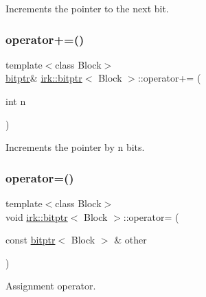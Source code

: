 Increments the pointer to the next bit. 

\mbox{\label{classirk_1_1bitptr_a9fcc393a8789c4500391ff3ff2a9fff7}} 
\subsubsection{\texorpdfstring{operator+=()}{operator+=()}}
{\footnotesize\ttfamily template$<$class Block$>$ \\
\mbox{\hyperlink{classirk_1_1bitptr}{bitptr}}\& \mbox{\hyperlink{classirk_1_1bitptr}{irk\+::bitptr}}$<$ Block $>$\+::operator+= (\begin{DoxyParamCaption}\item[{int}]{n }\end{DoxyParamCaption})\hspace{0.3cm}{\ttfamily [inline]}}



Increments the pointer by {\ttfamily n} bits. 

\mbox{\label{classirk_1_1bitptr_a60b3f1dcb2d6c9f8102c0e077937dcc5}} 
\subsubsection{\texorpdfstring{operator=()}{operator=()}}
{\footnotesize\ttfamily template$<$class Block$>$ \\
void \mbox{\hyperlink{classirk_1_1bitptr}{irk\+::bitptr}}$<$ Block $>$\+::operator= (\begin{DoxyParamCaption}\item[{const \mbox{\hyperlink{classirk_1_1bitptr}{bitptr}}$<$ Block $>$ \&}]{other }\end{DoxyParamCaption})\hspace{0.3cm}{\ttfamily [inline]}}



Assignment operator. 

\mbox{\label{classirk_1_1bitptr_a1df6b87e20b41de54fd6d582263a905d}} 
